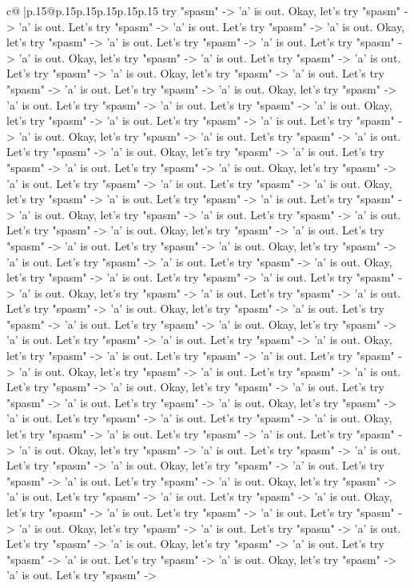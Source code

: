 \documentclass{article}
\begin{document}
{\begin{supertabular}{c@{$\;$}|p{.15\linewidth}@{}p{.15\linewidth}p{.15\linewidth}p{.15\linewidth}p{.15\linewidth}p{.15\linewidth}}
{{{try "spasm" {-}> 'a' is out. Okay, let's try "spasm" {-}> 'a' is out. Let's try "spasm" {-}> 'a' is out. Let's try "spasm" {-}> 'a' is out. Okay, let's try "spasm" {-}> 'a' is out. Let's try "spasm" {-}> 'a' is out. Let's try "spasm" {-}> 'a' is out. Okay, let's try "spasm" {-}> 'a' is out. Let's try "spasm" {-}> 'a' is out. Let's try "spasm" {-}> 'a' is out. Okay, let's try "spasm" {-}> 'a' is out. Let's try "spasm" {-}> 'a' is out. Let's try "spasm" {-}> 'a' is out. Okay, let's try "spasm" {-}> 'a' is out. Let's try "spasm" {-}> 'a' is out. Let's try "spasm" {-}> 'a' is out. Okay, let's try "spasm" {-}> 'a' is out. Let's try "spasm" {-}> 'a' is out. Let's try "spasm" {-}> 'a' is out. Okay, let's try "spasm" {-}> 'a' is out. Let's try "spasm" {-}> 'a' is out. Let's try "spasm" {-}> 'a' is out. Okay, let's try "spasm" {-}> 'a' is out. Let's try "spasm" {-}> 'a' is out. Let's try "spasm" {-}> 'a' is out. Okay, let's try "spasm" {-}> 'a' is out. Let's try "spasm" {-}> 'a' is out. Let's try "spasm" {-}> 'a' is out. Okay, let's try "spasm" {-}> 'a' is out. Let's try "spasm" {-}> 'a' is out. Let's try "spasm" {-}> 'a' is out. Okay, let's try "spasm" {-}> 'a' is out. Let's try "spasm" {-}> 'a' is out. Let's try "spasm" {-}> 'a' is out. Okay, let's try "spasm" {-}> 'a' is out. Let's try "spasm" {-}> 'a' is out. Let's try "spasm" {-}> 'a' is out. Okay, let's try "spasm" {-}> 'a' is out. Let's try "spasm" {-}> 'a' is out. Let's try "spasm" {-}> 'a' is out. Okay, let's try "spasm" {-}> 'a' is out. Let's try "spasm" {-}> 'a' is out. Let's try "spasm" {-}> 'a' is out. Okay, let's try "spasm" {-}> 'a' is out. Let's try "spasm" {-}> 'a' is out. Let's try "spasm" {-}> 'a' is out. Okay, let's try "spasm" {-}> 'a' is out. Let's try "spasm" {-}> 'a' is out. Let's try "spasm" {-}> 'a' is out. Okay, let's try "spasm" {-}> 'a' is out. Let's try "spasm" {-}> 'a' is out. Let's try "spasm" {-}> 'a' is out. Okay, let's try "spasm" {-}> 'a' is out. Let's try "spasm" {-}> 'a' is out. Let's try "spasm" {-}> 'a' is out. Okay, let's try "spasm" {-}> 'a' is out. Let's try "spasm" {-}> 'a' is out. Let's try "spasm" {-}> 'a' is out. Okay, let's try "spasm" {-}> 'a' is out. Let's try "spasm" {-}> 'a' is out. Let's try "spasm" {-}> 'a' is out. Okay, let's try "spasm" {-}> 'a' is out. Let's try "spasm" {-}> 'a' is out. Let's try "spasm" {-}> 'a' is out. Okay, let's try "spasm" {-}> 'a' is out. Let's try "spasm" {-}> 'a' is out. Let's try "spasm" {-}> 'a' is out. Okay, let's try "spasm" {-}> 'a' is out. Let's try "spasm" {-}> 'a' is out. Let's try "spasm" {-}> 'a' is out. Okay, let's try "spasm" {-}> 'a' is out. Let's try "spasm" {-}> 'a' is out. Let's try "spasm" {-}> 'a' is out. Okay, let's try "spasm" {-}> 'a' is out. Let's try "spasm" {-}> 'a' is out. Let's try "spasm" {-}> 'a' is out. Okay, let's try "spasm" {-}> 'a' is out. Let's try "spasm" {-}> 'a' is out. Let's try "spasm" {-}> 'a' is out. Okay, let's try "spasm" {-}> 'a' is out. Let's try "spasm" {-}> 'a' is out. Let's try "spasm" {-}> 'a' is out. Okay, let's try "spasm" {-}> 'a' is out. Let's try "spasm" {-}> 'a' is out. Let's try "spasm" {-}> 'a' is out. Okay, let's try "spasm" {-}> 'a' is out. Let's try "spasm" {-}> }}}
\end{supertabular}}
\end{document}
